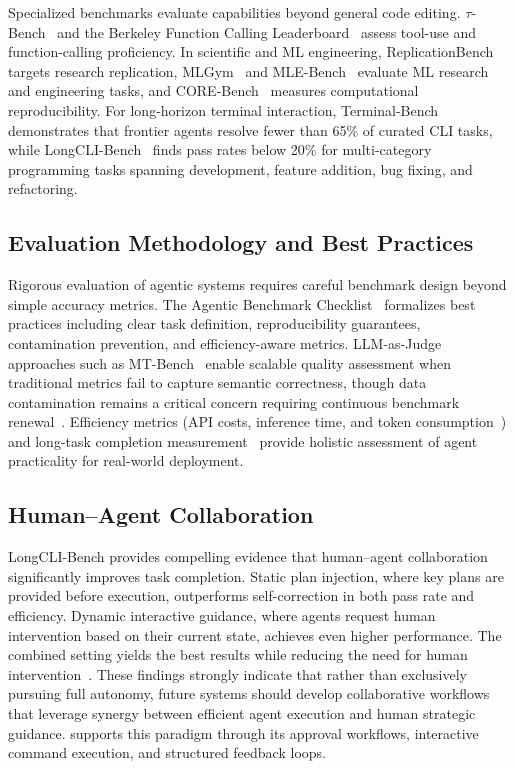 Specialized benchmarks evaluate capabilities beyond general code editing. $\tau$-Bench~\cite{taubench} and the Berkeley Function Calling Leaderboard~\cite{patil2025bfcl} assess tool-use and function-calling proficiency. In scientific and ML engineering, ReplicationBench~\cite{ye2025replicationbenchaiagentsreplicate} targets research replication, MLGym~\cite{mlgym} and MLE-Bench~\cite{MLEBench} evaluate ML research and engineering tasks, and CORE-Bench~\cite{COREBench} measures computational reproducibility. For long-horizon terminal interaction, Terminal-Bench~\cite{terminal_bench} demonstrates that frontier agents resolve fewer than 65\% of curated CLI tasks, while LongCLI-Bench~\cite{longcli_bench} finds pass rates below 20\% for multi-category programming tasks spanning development, feature addition, bug fixing, and refactoring.

\subsection{Evaluation Methodology and Best Practices}

Rigorous evaluation of agentic systems requires careful benchmark design beyond simple accuracy metrics. The Agentic Benchmark Checklist~\cite{agenticbenchmarkchecklist, zhuEstablishingBestPractices2025} formalizes best practices including clear task definition, reproducibility guarantees, contamination prevention, and efficiency-aware metrics. LLM-as-Judge approaches such as MT-Bench~\cite{zheng2023judging} enable scalable quality assessment when traditional metrics fail to capture semantic correctness, though data contamination remains a critical concern requiring continuous benchmark renewal~\cite{contamination_survey, contamination_modern}. Efficiency metrics (API costs, inference time, and token consumption~\cite{efficiency_metrics}) and long-task completion measurement~\cite{long_task_measurement, kwaMeasuringAIAbility2025} provide holistic assessment of agent practicality for real-world deployment.

\subsection{Human--Agent Collaboration}
LongCLI-Bench provides compelling evidence that human--agent collaboration significantly improves task completion. Static plan injection, where key plans are provided before execution, outperforms self-correction in both pass rate and efficiency. Dynamic interactive guidance, where agents request human intervention based on their current state, achieves even higher performance. The combined setting yields the best results while reducing the need for human intervention~\cite{longcli_bench}. These findings strongly indicate that rather than exclusively pursuing full autonomy, future systems should develop collaborative workflows that leverage synergy between efficient agent execution and human strategic guidance. \name supports this paradigm through its approval workflows, interactive command execution, and structured feedback loops.

